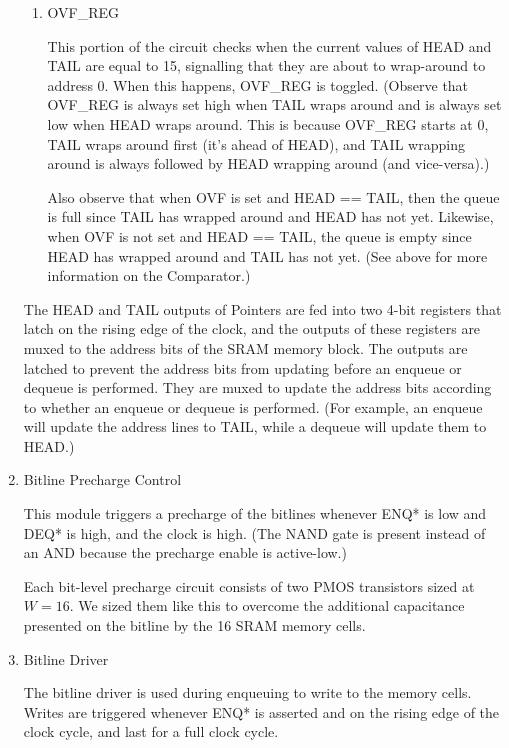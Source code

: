 \documentclass[12pt]{report}
\begin{document}
\begin{enumerate}
\begin{enumerate}
    \item OVF\_REG

    This portion of the circuit checks when the current values of HEAD and TAIL are equal to 15, signalling that they are about to wrap-around to address 0. When this happens, OVF\_REG is toggled. (Observe that OVF\_REG is always set high when TAIL wraps around and is always set low when HEAD wraps around. This is because OVF\_REG starts at 0, TAIL wraps around first (it's ahead of HEAD), and TAIL wrapping around is always followed by HEAD wrapping around (and vice-versa).)

    Also observe that when OVF is set and HEAD == TAIL, then the queue is full since TAIL has wrapped around and HEAD has not yet. Likewise, when OVF is not set and HEAD == TAIL, the queue is empty since HEAD has wrapped around and TAIL has not yet. (See above for more information on the Comparator.)
  \end{enumerate}

  The HEAD and TAIL outputs of Pointers are fed into two 4-bit registers that latch on the rising edge of the clock, and the outputs of these registers are muxed to the address bits of the SRAM memory block. The outputs are latched to prevent the address bits from updating before an enqueue or dequeue is performed. They are muxed to update the address bits according to whether an enqueue or dequeue is performed. (For example, an enqueue will update the address lines to TAIL, while a dequeue will update them to HEAD.)

  \item Bitline Precharge Control

  This module triggers a precharge of the bitlines whenever ENQ* is low and DEQ* is high, and the clock is high. (The NAND gate is present instead of an AND because the precharge enable is active-low.)

  Each bit-level precharge circuit consists of two PMOS transistors sized at $W = 16$. We sized them like this to overcome the additional capacitance presented on the bitline by the 16 SRAM memory cells.

  \item Bitline Driver

  The bitline driver is used during enqueuing to write to the memory cells. Writes are triggered whenever ENQ* is asserted and on the rising edge of the clock cycle, and last for a full clock cycle.
\end{enumerate}
\end{document}
